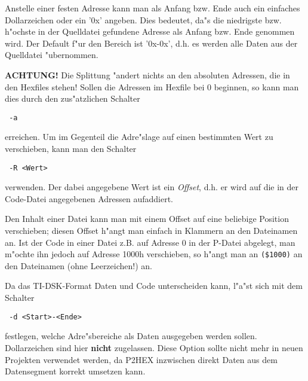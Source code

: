 \documentclass[12pt,a4paper,twoside]{report}
\newcommand{\bb}[1]{{\bf #1}}
\newcommand{\tty}[1]{{\tt #1}}
\begin{document}
Anstelle einer festen Adresse kann man als Anfang bzw. Ende auch ein
einfaches Dollarzeichen oder ein '0x' angeben.  Dies bedeutet, da"s die
niedrigste bzw. h"ochste in der Quelldatei gefundene Adresse als Anfang
bzw. Ende genommen wird.  Der Default f"ur den Bereich ist '0x-0x', d.h.
es werden alle Daten aus der Quelldatei "ubernommen.
\par
\bb{ACHTUNG!} Die Splittung "andert nichts an den absoluten Adressen, die
in den Hexfiles stehen!  Sollen die Adressen im Hexfile bei 0 beginnen,
so kann man dies durch den zus"atzlichen Schalter
\begin{verbatim}
 -a
\end{verbatim}
erreichen.  Um im Gegenteil die Adre"slage auf einen bestimmten Wert zu
verschieben, kann man den Schalter
\begin{verbatim}
 -R <Wert>
\end{verbatim}
verwenden.  Der dabei angegebene Wert ist ein {\em Offset}, d.h. er wird
auf die in der Code-Datei angegebenen Adressen aufaddiert.
\par
Den Inhalt einer Datei kann man mit einem Offset auf eine beliebige
Position verschieben; diesen Offset h"angt man einfach in Klammern an
den Dateinamen an.  Ist der Code in einer Datei z.B. auf Adresse 0 in
der P-Datei abgelegt, man m"ochte ihn jedoch auf Adresse 1000h
verschieben, so h"angt man an \tty{(\$1000)} an den Dateinamen (ohne
Leerzeichen!) an.
\par
Da das TI-DSK-Format Daten und Code unterscheiden kann, l"a"st sich
mit dem Schalter
\begin{verbatim}
 -d <Start>-<Ende>
\end{verbatim}
festlegen, welche Adre"sbereiche als Daten ausgegeben werden sollen.
Dollarzeichen sind hier \bb{nicht} zugelassen.  Diese Option sollte
nicht mehr in neuen Projekten verwendet werden, da P2HEX inzwischen
direkt Daten aus dem Datensegment korrekt umsetzen kann.
\end{document}
